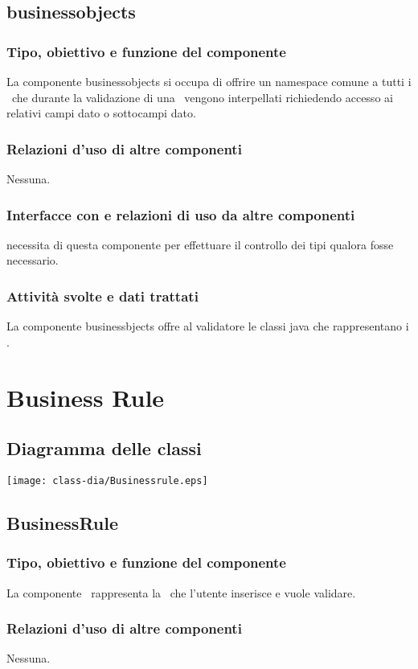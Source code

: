 \subsection{businessobjects}%
\subsubsection{Tipo, obiettivo e funzione del componente}
La componente businessobjects si occupa di offrire un namespace comune a tutti i \bos\ che durante la validazione di una \br\ vengono interpellati richiedendo accesso ai relativi campi dato o sottocampi dato.
\subsubsection{Relazioni d'uso di altre componenti}
Nessuna.
\subsubsection{Interfacce con e relazioni di uso da altre componenti}
\brp necessita di questa componente per effettuare il controllo dei tipi qualora fosse necessario.
\subsubsection{Attivit\`a svolte e dati trattati}
La componente businessbjects offre al validatore le classi java che rappresentano i \bos.

\section{Business Rule}
\subsection{Diagramma delle classi}
\begin{center}
\texttt{[image: class-dia/Businessrule.eps]}
\end{center}
\subsection{BusinessRule}
\subsubsection{Tipo, obiettivo e funzione del componente}
La componente \BR\ rappresenta la \br\ che l'utente inserisce e vuole validare.
\subsubsection{Relazioni d'uso di altre componenti}
Nessuna.
